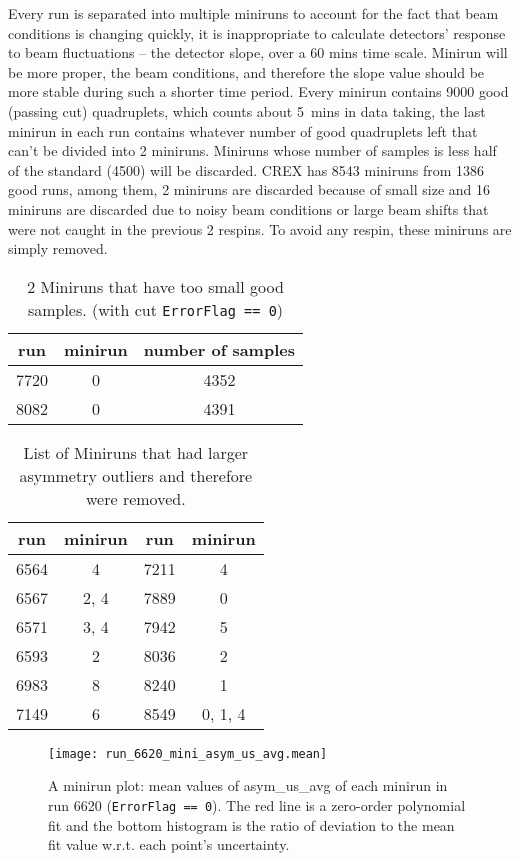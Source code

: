 Every run is separated into multiple miniruns to account for the fact that beam
conditions is changing quickly, it is inappropriate to calculate detectors'
response to beam fluctuations -- the detector slope, over a 60 mins time scale. 
Minirun will be more proper, the beam conditions, and therefore
the slope value should be more stable during such a shorter time period.  
Every minirun contains 9000 good (passing cut) quadruplets, which counts about 5~mins
in data taking, the last minirun in each run contains 
whatever number of good quadruplets left that can't be divided into 2 miniruns. 
Miniruns whose number of samples is less half of the standard (4500) will be discarded.
CREX has 8543 miniruns from 1386 good runs, among them, 2 miniruns are discarded
because of small size and 16 miniruns are discarded due to noisy beam conditions 
or large beam shifts that were not caught in the previous 2 respins.
To avoid any respin, these miniruns are simply removed. %
\begin{table}
    \centering
    \begin{tabular}{c c c}
	\hline
	run & minirun	& number of samples \\
	\hline
	7720	& 0 & 4352  \\
	8082	& 0 & 4391  \\
	\hline
    \end{tabular}
    \caption{2 Miniruns that have too small good samples. (with cut \texttt{ErrorFlag == 0})}
    \label{tab:short_miniruns}
\end{table}
\begin{table}
    \centering
    \begin{tabular}{c c | c c}
	\hline
	run & minirun	& run	& minirun   \\
	\hline
	6564	& 4	& 7211	& 4 \\
	6567	& 2, 4	& 7889	& 0 \\
	6571	& 3, 4	& 7942	& 5 \\
	6593	& 2	& 8036	& 2 \\
	6983	& 8	& 8240	& 1 \\
	7149	& 6	& 8549	& 0, 1, 4   \\
	\hline
    \end{tabular}
    \caption{List of Miniruns that had larger asymmetry outliers and therefore
    were removed.}
\end{table}
\begin{figure}
    \centering
    \texttt{[image: run\_6620\_mini\_asym\_us\_avg.mean]}
    \caption{A minirun plot: mean values of asym\_us\_avg of each minirun in 
    run 6620 (\texttt{ErrorFlag == 0}).
    The red line is a zero-order polynomial fit and the bottom histogram is
    the ratio of deviation to the mean fit value w.r.t. each point's uncertainty.
    }
\end{figure}

